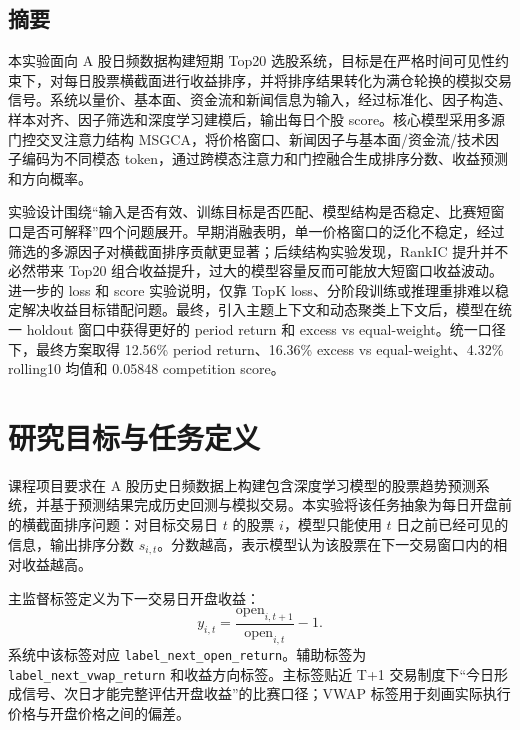 \documentclass[UTF8,a4paper,12pt,fontset=none]{ctexart}
\begin{document}
\begin{center}
\begin{minipage}{0.88\textwidth}
\setlength{\parindent}{0pt}
\raggedright
\section*{摘要}

本实验面向 A 股日频数据构建短期 Top20 选股系统，目标是在严格时间可见性约束下，对每日股票横截面进行收益排序，并将排序结果转化为满仓轮换的模拟交易信号。系统以量价、基本面、资金流和新闻信息为输入，经过标准化、因子构造、样本对齐、因子筛选和深度学习建模后，输出每日个股 score。核心模型采用多源门控交叉注意力结构 MSGCA，将价格窗口、新闻因子与基本面/资金流/技术因子编码为不同模态 token，通过跨模态注意力和门控融合生成排序分数、收益预测和方向概率。

实验设计围绕“输入是否有效、训练目标是否匹配、模型结构是否稳定、比赛短窗口是否可解释”四个问题展开。早期消融表明，单一价格窗口的泛化不稳定，经过筛选的多源因子对横截面排序贡献更显著；后续结构实验发现，RankIC 提升并不必然带来 Top20 组合收益提升，过大的模型容量反而可能放大短窗口收益波动。进一步的 loss 和 score 实验说明，仅靠 TopK loss、分阶段训练或推理重排难以稳定解决收益目标错配问题。最终，引入主题上下文和动态聚类上下文后，模型在统一 holdout 窗口中获得更好的 period return 和 excess vs equal-weight。统一口径下，最终方案取得 12.56\% period return、16.36\% excess vs equal-weight、4.32\% rolling10 均值和 0.05848 competition score。

\end{minipage}
\end{center}

\vspace{0.6cm}
\tableofcontents
\newpage
\raggedright

\section{研究目标与任务定义}

课程项目要求在 A 股历史日频数据上构建包含深度学习模型的股票趋势预测系统，并基于预测结果完成历史回测与模拟交易。本实验将该任务抽象为每日开盘前的横截面排序问题：对目标交易日 $t$ 的股票 $i$，模型只能使用 $t$ 日之前已经可见的信息，输出排序分数 $s_{i,t}$。分数越高，表示模型认为该股票在下一交易窗口内的相对收益越高。

主监督标签定义为下一交易日开盘收益：
\[
  y_{i,t}=\frac{\mathrm{open}_{i,t+1}}{\mathrm{open}_{i,t}}-1.
\]
系统中该标签对应 \texttt{label\_next\_open\_return}。辅助标签为 \texttt{label\_next\_vwap\_return} 和收益方向标签。主标签贴近 T+1 交易制度下“今日形成信号、次日才能完整评估开盘收益”的比赛口径；VWAP 标签用于刻画实际执行价格与开盘价格之间的偏差。
\end{document}
